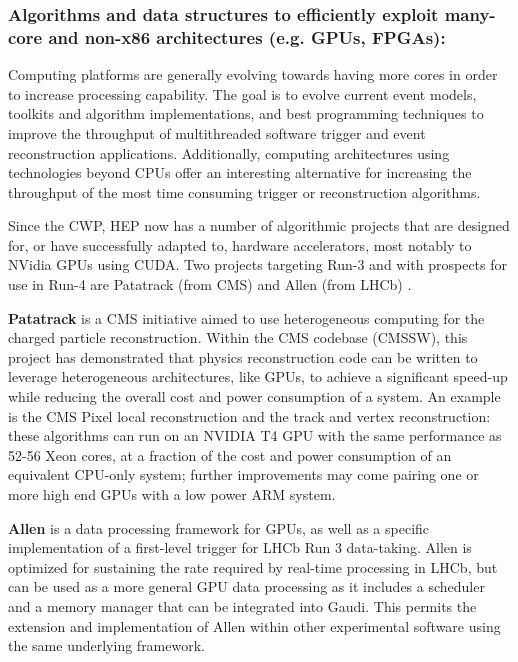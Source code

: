 \hypertarget{algorithms-and-data-structures-to-efficiently-exploit-many-core-and-non-x86-architectures-e.g.-gpus-fpgas}{%
\subsubsection{\texorpdfstring{Algorithms and data structures to
efficiently exploit many-core and non-x86 architectures (e.g. GPUs,
FPGAs):
}{Algorithms and data structures to efficiently exploit many-core and non-x86 architectures (e.g. GPUs, FPGAs): }}\label{algorithms-and-data-structures-to-efficiently-exploit-many-core-and-non-x86-architectures-e.g.-gpus-fpgas}}

Computing platforms are generally evolving towards having more cores in
order to increase processing capability. The goal is to evolve current
event models, toolkits and algorithm implementations, and best
programming techniques to improve the throughput of multithreaded
software trigger and event reconstruction applications. Additionally,
computing architectures using technologies beyond CPUs offer an
interesting alternative for increasing the throughput of the most time
consuming trigger or reconstruction algorithms.

Since the CWP, HEP now has a number of algorithmic projects that are
designed for, or have successfully adapted to, hardware accelerators,
most notably to NVidia GPUs using CUDA. Two projects targeting Run-3 and
with prospects for use in Run-4 are Patatrack (from CMS) \cite{andrea_bocci_2019_3598824} and
Allen (from LHCb) \cite{Aaij:2019zbu}.

\textbf{Patatrack} is a CMS initiative aimed to use heterogeneous
computing for the charged particle reconstruction. Within the CMS
codebase (CMSSW), this project has demonstrated that physics
reconstruction code can be written to leverage heterogeneous
architectures, like GPUs, to achieve a significant speed-up while
reducing the overall cost and power consumption of a system. An example
is the CMS Pixel local reconstruction and the track and vertex
reconstruction: these algorithms can run on an NVIDIA T4 GPU with the
same performance as 52-56 Xeon cores, at a fraction of the cost and
power consumption of an equivalent CPU-only system; further improvements
may come pairing one or more high end GPUs with a low power ARM system.

\textbf{Allen} is a data processing framework for GPUs, as well as a
specific implementation of a first-level trigger for LHCb Run 3
data-taking. Allen is optimized for sustaining the rate required by
real-time processing in LHCb, but can be used as a more general GPU data
processing as it includes a scheduler and a memory manager that can be
integrated into Gaudi. This permits the extension and implementation of
Allen within other experimental software using the same underlying
framework.

